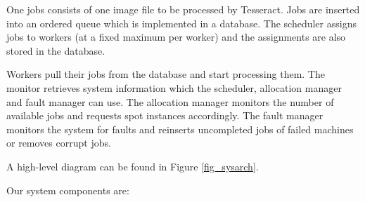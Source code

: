 \documentclass[a4paper]{IEEEtran}
\begin{document}
One jobs consists of one image file to be processed by Tesseract. Jobs are inserted into an ordered queue which is implemented in a database. The scheduler assigns jobs to workers (at a fixed maximum per worker) and the assignments are also stored in the database.

Workers pull their jobs from the database and start processing them. The monitor retrieves system information which the scheduler, allocation manager and fault manager can use. The allocation manager monitors the number of available jobs and requests spot instances accordingly. The fault manager monitors the system for faults and reinserts uncompleted jobs of failed machines or removes corrupt jobs.

A high-level diagram can be found in Figure \ref{fig_sysarch}.

Our system components are:
\end{document}
